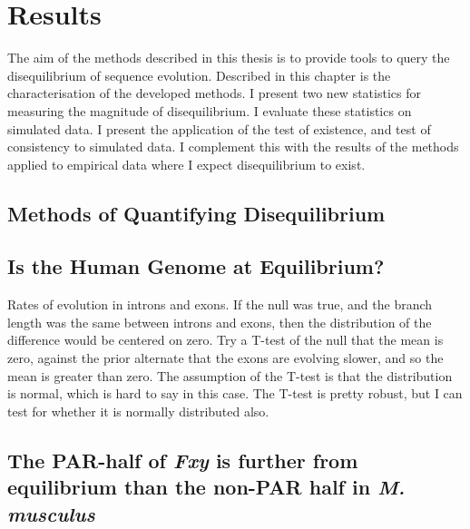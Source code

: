 \chapter{Results}

The aim of the methods described in this thesis is to provide tools to query the disequilibrium of sequence evolution. Described in this chapter is the characterisation of the developed methods. I present two new statistics for measuring the magnitude of disequilibrium. I evaluate these statistics on simulated data. I present the application of the test of existence, and test of consistency to simulated data. I complement this with the results of the methods applied to empirical data where I expect disequilibrium to exist.

\section{Methods of Quantifying Disequilibrium}






\section{Is the Human Genome at Equilibrium?}





Rates of evolution in introns and exons. If the null was true, and the branch length was the same between introns and exons, then the distribution of the difference would be centered on zero. Try a T-test of the null that the mean is zero, against the prior alternate that the exons are evolving slower, and so the mean is greater than zero. The assumption of the T-test is that the distribution is normal, which is hard to say in this case. The T-test is pretty robust, but I can test for whether it is normally distributed also. 






 
\section{The PAR-half of \textit{Fxy} is further from equilibrium than the non-PAR half in \textit{M. musculus}}
